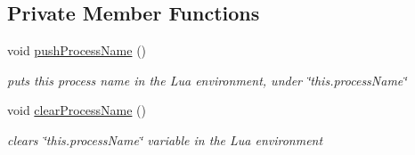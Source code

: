 \subsection*{Private Member Functions}
\begin{CompactItemize}
\item 
void \hyperlink{classEOSProcess_f05d10a4411470314d51dea89c980967}{pushProcessName} ()
\begin{CompactList}\small\item\em puts this process name in the Lua environment, under \char`\"{}this.processName\char`\"{} \item\end{CompactList}\item 
void \hyperlink{classEOSProcess_9beab4f3d93c870ce78905dff204ed14}{clearProcessName} ()
\begin{CompactList}\small\item\em clears \char`\"{}this.processName\char`\"{} variable in the Lua environment \item\end{CompactList}\end{CompactItemize}
